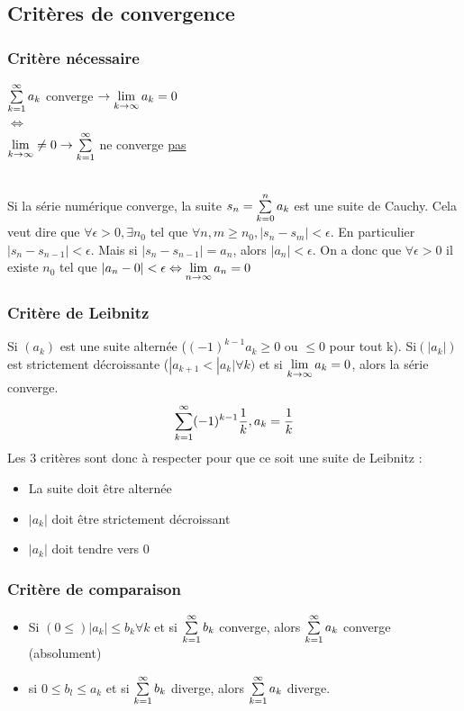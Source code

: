 \documentclass[12pt,a4paper]{article}
\begin{document}
{\subsection{Critères de convergence}
\subsubsection{Critère nécessaire}
\begin{boite}[0.6]
\begin{center}
$\somme{\infty}{k=1}a_k$ converge $ \to \limite{k\to \infty}a_k = 0$\\
$\Leftrightarrow$\\
$\limite{k\to\infty}\neq 0 \to \somme{\infty}{k=1}$ ne converge \underline{pas}
\end{center}
\end{boite}
\\
Si la série numérique converge, la suite $s_n = \somme{n}{k=0}a_k$ est une suite de Cauchy. Cela veut dire que $\forall \epsilon > 0, \exists n_0$ tel que $\forall n,m\geq n_0, |s_n-s_m|<\epsilon$. En particulier $|s_n - s_{n-1}| < \epsilon$. Mais si $|s_n - s_{n-1}| = a_n$, alors $|a_n| < \epsilon.$ On a donc que $\forall \epsilon > 0$ il existe $n_0$ tel que $|a_n - 0| < \epsilon \Leftrightarrow \limite{\ninf}a_n = 0$
\subsubsection{Critère de Leibnitz}
Si $(a_k)$ est une suite alternée ($(-1)^{k-1}a_k\geq 0$ ou $\leq 0$ pour tout k). Si$(|a_k|)$ est strictement décroissante ($|a_{k+1} < |a_k| \forall k)$ et si $\limite{k\to\infty}a_k =0$, alors la série converge.\\
\begin{equation}
\somme{\infty}{k=1}(-1)^{k-1}\frac{1}{k}, a_k = \frac{1}{k}
\end{equation}
Les 3 critères sont donc à respecter pour que ce soit une suite de Leibnitz :
\begin{itemize}
	\item La suite doit être alternée
	\item $|a_k|$ doit être strictement décroissant
	\item $|a_k|$ doit tendre vers 0
\end{itemize}

\subsubsection{Critère de comparaison}
\begin{boite}
\begin{itemize}
	\item Si $(0 \leq) |a_k| \leq b_k \forall k$ et si $\somme{\infty}{k=1}b_k$  converge, alors $\somme{\infty}{k=1}a_k$ converge (absolument)
	\item si $0 \leq b_l \leq a_k$ et si $\somme{\infty}{k=1}b_k$ diverge, alors $\somme{\infty}{k=1}a_k$ diverge.
\end{itemize}
\end{boite}
}
\end{document}
